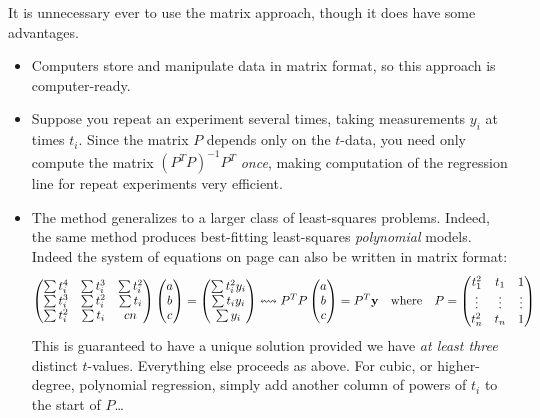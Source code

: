 \pagebreak[3]


It is unnecessary ever to use the matrix approach, though it does have some advantages.
\begin{itemize}
  \item Computers store and manipulate data in matrix format, so this approach is computer-ready.
  \item Suppose you repeat an experiment several times, taking measurements $y_i$ at times $t_i$. Since the matrix $P$ depends only on the $t$-data, you need only compute the matrix $(P^TP)^{-1}P^T$ \emph{once}, making computation of the regression line for repeat experiments very efficient. 
  \item The method generalizes to a larger class of least-squares problems. Indeed, the same method produces best-fitting least-squares \emph{polynomial} models. Indeed the system of equations on page \pageref{sec:regpoly} can also be written in matrix format:
	\[
		\begin{pmatrix}
			\sum t_i^4 & \sum t_i^3 & \sum t_i^2\\
			\sum t_i^3 & \sum t_i^2 & \sum t_i\\
			\sum t_i^2 & \sum t_i & cn
		\end{pmatrix}
		\begin{pmatrix}a\\b\\c\end{pmatrix}=\begin{pmatrix}\sum t_i^2y_i\\\sum t_iy_i\\\sum y_i\end{pmatrix}
		\leftrightsquigarrow
		P^TP\begin{pmatrix}a\\b\\c\end{pmatrix}=P^T{\mathbf{y}}
		\quad\text{where}\quad
		P=
		\begin{pmatrix}
			t_1^2&t_1&1\\
			\vdots&\vdots&\vdots\\
			t_n^2&t_n&1
		\end{pmatrix}
	\]
	This is guaranteed to have a unique solution provided we have \emph{at least three} distinct $t$-values. Everything else proceeds as above. For cubic, or higher-degree, polynomial regression, simply add another column of powers of $t_i$ to the start of $P$\ldots 
\end{itemize}


\pagebreak[3]


